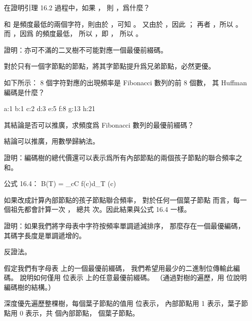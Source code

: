 \startsection[
  title={Huffman codes},
]

\startEXERCISE
在證明引理 16.2 過程中，如果 ，
則 ，爲什麼？
\stopEXERCISE

\startANSWER
{} 和  是頻度最低的兩個字符，則由於 ，可知 。
又由於 ，因此 ；
再者 ，所以 。
而 ，因爲  的頻度最低，
所以 ，即 ，
所以 。
\stopANSWER

\startEXERCISE
證明：亦可不滿的二叉樹不可能對應一個最優前綴碼。
\stopEXERCISE

\startANSWER
對於只有一個字節點的節點，將其字節點提升爲兄弟節點，必然更優。
\stopANSWER

\startEXERCISE
如下所示： 8 個字符對應的出現頻率是 Fibonacci 數列的前 8 個數，
其 Huffman 編碼是什麼？

a:1 b:1 c:2 d:3 e:5 f:8 g:13 h:21

其結論是否可以推廣，求頻度爲 Fibonacci 數列的最優前綴碼？
\stopEXERCISE

\startANSWER
結論可以推廣，用數學歸納法。

\externalfigure[output/e16_3_3-1]
\stopANSWER

\startEXERCISE
證明：編碼樹的總代價還可以表示爲所有內部節點的兩個孩子節點的聯合頻率之和。
\stopEXERCISE

\startANSWER
公式 16.4：
\startformula
B(T) = \sum_{c\in C} f(c)d_{T} (c)
\stopformula

如果改成計算內部節點的孩子節點聯合頻率，
對於任何一個葉子節點  而言，每一個祖先都會計算一次 ，
總共  次。因此結果與公式 16.4 一樣。
\stopANSWER

\startEXERCISE
證明：如果我們將字母表中字符按頻率單調遞減排序，
那麼存在一個最優編碼，其碼字長度是單調遞增的。
\stopEXERCISE

\startANSWER
反證法。
\stopANSWER

\startEXERCISE
假定我們有字母表  上的一個最優前綴碼，
我們希望用最少的二進制位傳輸此編碼。
說明如何僅用  位表示  上的任意最優前綴碼。
（\hint 通過對樹的遍歷，用  位說明編碼樹的結構。）
\stopEXERCISE

\startANSWER
深度優先遍歷整棵樹，每個葉子節點的值用  位表示，
內部節點用 1 表示，葉子節點用 0 表示，共  個內部節點，  個葉子節點。
\stopANSWER

